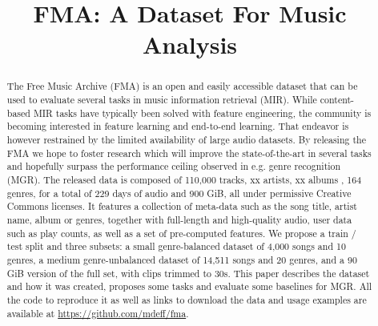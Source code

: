 \documentclass{article}
\title{FMA: A Dataset For Music Analysis}
\newcommand{\todo}[1]{{\color{red} #1 }}
\begin{document}
\maketitle

\begin{abstract}
The Free Music Archive (FMA) is an open and easily accessible dataset that can be used to evaluate several tasks in music information retrieval (MIR).
While content-based MIR tasks have typically been solved with feature engineering,
the community is becoming interested in feature learning and end-to-end learning. %
That endeavor is however restrained by the limited availability of large audio datasets.
By releasing the FMA we hope to foster research which will improve the state-of-the-art in several tasks and hopefully surpass the performance ceiling observed in e.g. genre recognition (MGR).
The released data is composed of \todo{110,000 tracks, xx artists, xx albums}, 164 genres, for a total of 229 days of audio and 900 GiB, all under permissive Creative Commons licenses.
It features a collection of meta-data such as the song title, artist name, album or genres, together with full-length and high-quality audio, user data such as play counts, as well as a set of pre-computed features. We propose a train / test split and three subsets: a small genre-balanced dataset of 4,000 songs and 10 genres, a medium genre-unbalanced dataset of 14,511 songs and 20 genres, and a 90 GiB version of the full set, with clips trimmed to 30s.
This paper describes the dataset and how it was created, proposes some tasks and evaluate some baselines for MGR.
All the code to reproduce it as well as links to download the data and usage examples are available at \url{https://github.com/mdeff/fma}.


\end{abstract}
\end{document}
